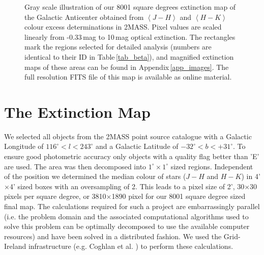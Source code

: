 \documentclass[useAMS,usenatbib]{mn2e}
\begin{document}
\begin{figure}
\endpicture 
\caption{\label{ext_map} Gray scale illustration of our 8001 square degrees
extinction map of the Galactic Anticenter obtained from $\left< J-H \right>$ and
$\left< H-K \right>$ colour excess determinations in 2MASS. Pixel values are
scaled linearly from -0.33\,mag to 10\,mag optical extinction. The rectangles
mark the regions selected for detailed analysis (numbers are identical to their
ID in Table\,\ref{tab_beta}), and magnified extinction maps of these areas can
be found in Appendix\,\ref{app_images}. The full resolution FITS file of this
map is available as online material.} 
\end{figure}


\section{The Extinction Map}
\label{extinction}

We selected all objects from the 2MASS point source catalogue with a Galactic
Longitude of $116^\circ < l < 243^\circ$ and a Galactic Latitude of $-32^\circ <
b < +31^\circ$. To ensure good photometric accuracy only objects with a quality
flag better than 'E' are used. The area was then decomposed into $1^\circ \times
1^\circ$ sized regions. Independent of the position we determined the median
colour of stars ($J-H$ and $H-K$) in 4'$\times$4' sized boxes with an
oversampling of 2. This leads to a pixel size of 2', 30$\times$30 pixels per
square degree, or 3810$\times$1890 pixel for our 8001 square degree sized final
map. The calculations required for such a project are embarrassingly parallel
(i.e. the problem domain and the associated computational algorithms used to
solve this problem can be optimally decomposed to use the available computer
resources) and have been solved in a distributed fashion. We used the
Grid-Ireland infrastructure (e.g. Coghlan et al. \cite{Coghlan2.05.EGC}) to
perform these calculations. 
\end{document}
